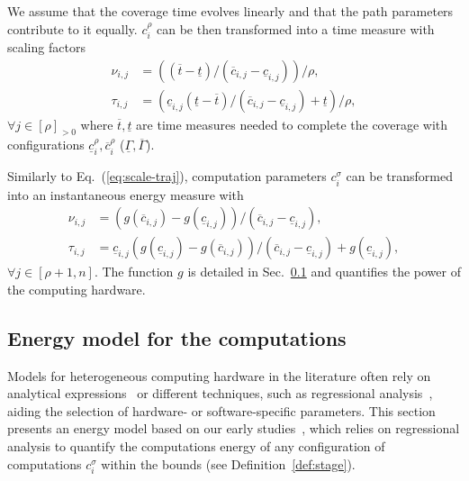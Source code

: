 \documentclass[letterpaper,10pt,conference,twoside]{IEEEtran}
\theoremstyle{definition}
\begin{document}
{\color{black}W}e assume that the coverage time evolves linearly{ \color{black}and that the }path parameters{ \color{black}contribute to it equally.} $c_i^\rho$ can be {\color{black}then} transformed into a time measure with scaling factors\begin{subequations}%
  \label{eq:scale-traj}\begin{align}
  \nu_{i,j}&=\left((\overline{t}-\underline{t})/(\overline{c}_{i,j}-\underline{c}_{i,j})\right)/\rho,\\
  \tau_{i,j}&=\left(\underline{c}_{i,j}(\underline{t}-\overline{t})/(\overline{c}_{i,j}-\underline{c}_{i,j})+\underline{t}\right)/\rho,
\end{align}\end{subequations} 
$\forall j\in[\rho]_{>0}$ where $\overline{t},\underline{t}$ are time measures needed to complete the coverage with configurations $\underline{c}_i^\rho,\overline{c}_i^\rho$ ($\underline{\Gamma},\overline{\Gamma}$).

Similarly to Eq.~(\ref{eq:scale-traj}), computation parameters $c_i^\sigma$ can be transformed into an instantaneous energy measure with %
\begin{subequations}%
  \label{eq:scale-comp}\begin{align}
  \nu_{i,j}&=(g(\overline{c}_{i,j})-g(\underline{c}_{i,j}))/(\overline{c}_{i,j}-\underline{c}_{i,j}),\\
  \tau_{i,j}&=\underline{c}_{i,j}(g(\underline{c}_{i,j})-g(\overline{c}_{i,j}))/(\overline{c}_{i,j}-\underline{c}_{i,j})+g(\underline{c}_{i,j}),
\end{align}\end{subequations}
$\forall j\in[\rho+1,n]$. The function $g$ is detailed in Sec.~\ref{sec:mod-com} and quantifies the power of the computing hardware.

\vspace*{.4ex}
\subsection{Energy model for the computations}
\label{sec:mod-com}

Models for heterogeneous computing hardware in the literature often rely on analytical expressions~\cite{marowka2017energy,%
yang2017designing} or different techniques, such as regressional analysis~\cite{bailey2014adaptive,ma2012holistic,seewald2019coarse}, aiding the selection of hardware- or software-specific parameters. This section presents an energy model based on our early studies~\cite{seewald2019component,seewald2019coarse}, which relies on regressional analysis to quantify the computations energy of any configuration of computations $c_i^\sigma$ within the bounds (see Definition~\ref{def:stage}).
\end{document}
